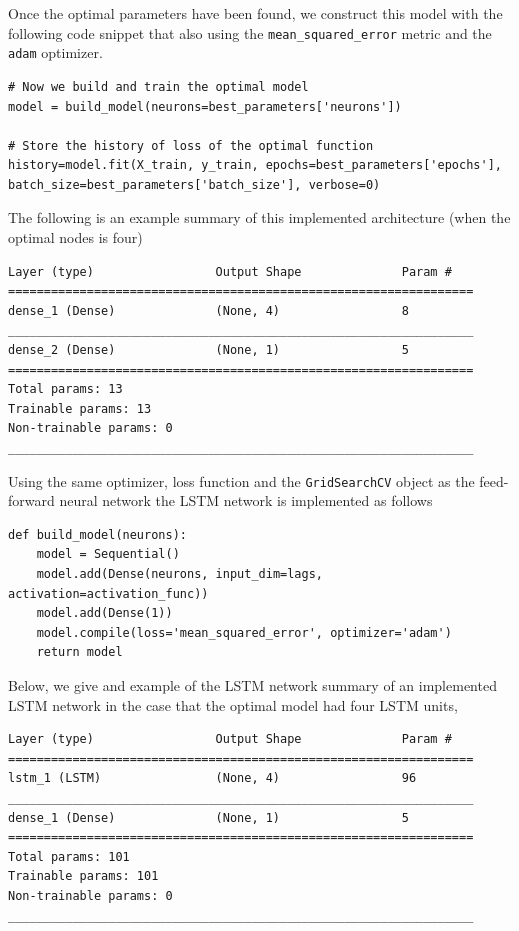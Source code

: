 \documentclass[10pt,a4paper]{article}
\begin{document}
Once the optimal parameters have been found, we construct this model with the following code snippet that also using the \verb|mean_squared_error| metric and the \verb|adam| optimizer.
\begin{lstlisting}
# Now we build and train the optimal model
model = build_model(neurons=best_parameters['neurons'])

# Store the history of loss of the optimal function
history=model.fit(X_train, y_train, epochs=best_parameters['epochs'], batch_size=best_parameters['batch_size'], verbose=0)
\end{lstlisting}
The following is an example summary of this implemented architecture (when the optimal nodes is four)
\begin{lstlisting}
Layer (type)                 Output Shape              Param #   
=================================================================
dense_1 (Dense)              (None, 4)                 8         
_________________________________________________________________
dense_2 (Dense)              (None, 1)                 5         
=================================================================
Total params: 13
Trainable params: 13
Non-trainable params: 0
_________________________________________________________________
\end{lstlisting}
Using the same optimizer, loss function and the \verb|GridSearchCV| object as the feed-forward neural network the LSTM network is implemented as follows
\begin{lstlisting}
def build_model(neurons):
    model = Sequential()
    model.add(Dense(neurons, input_dim=lags, activation=activation_func))
    model.add(Dense(1))
    model.compile(loss='mean_squared_error', optimizer='adam')
    return model
\end{lstlisting}
Below, we give and example of the LSTM network summary of an implemented LSTM network in the case that the optimal model had four LSTM units,
\begin{lstlisting}
Layer (type)                 Output Shape              Param #   
=================================================================
lstm_1 (LSTM)                (None, 4)                 96        
_________________________________________________________________
dense_1 (Dense)              (None, 1)                 5         
=================================================================
Total params: 101
Trainable params: 101
Non-trainable params: 0
_________________________________________________________________
\end{lstlisting}
\end{document}
